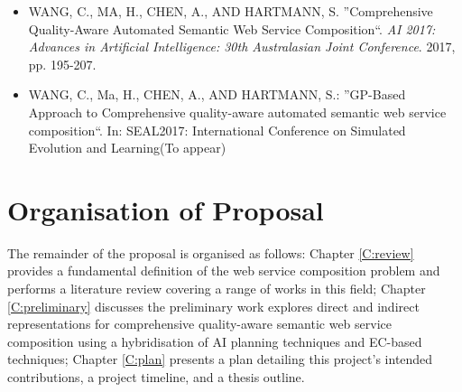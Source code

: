 \begin{itemize}
 \item WANG, C., MA, H., CHEN, A., AND HARTMANN, S. ''Comprehensive Quality-Aware Automated Semantic Web Service Composition``. \textit{AI 2017: Advances in Artificial Intelligence: 30th Australasian Joint Conference}. 2017, pp. 195-207.
 \item WANG, C., Ma, H., CHEN, A., AND HARTMANN, S.: ''GP-Based Approach to Comprehensive quality-aware automated semantic web service composition``. In: SEAL2017: International Conference on Simulated Evolution and Learning(To appear)
\end{itemize}


\section{Organisation of Proposal}The remainder of the proposal is organised as follows: Chapter \ref{C:review} provides a fundamental definition of the web service composition problem and performs a literature review covering a range of works in this field; Chapter \ref{C:preliminary} discusses the preliminary work explores direct and indirect representations for comprehensive quality-aware semantic web service composition using a hybridisation of AI planning techniques and EC-based techniques; Chapter \ref{C:plan} presents a plan detailing this project's intended contributions, a project timeline, and a thesis outline.

